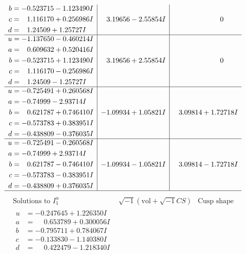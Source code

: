 \documentclass[1p]{elsarticle_modified}
\theoremstyle{definition}
\newcommand{\I}{\sqrt{-1}}
\begin{document}
$$\begin{array}{c|c|c}
\begin{aligned}
b &= -0.523715 - 1.123490 I \\
c &= \phantom{-}1.116170 + 0.256986 I \\
d &= \phantom{-}1.24509 + 1.25727 I\end{aligned}
 & \phantom{-}3.19656 - 2.55854 I & \phantom{-0.000000 } 0 \\ \hline\begin{aligned}
u &= -1.137650 - 0.460214 I \\
a &= \phantom{-}0.609632 + 0.520416 I \\
b &= -0.523715 + 1.123490 I \\
c &= \phantom{-}1.116170 - 0.256986 I \\
d &= \phantom{-}1.24509 - 1.25727 I\end{aligned}
 & \phantom{-}3.19656 + 2.55854 I & \phantom{-0.000000 } 0 \\ \hline\begin{aligned}
u &= -0.725491 + 0.260568 I \\
a &= -0.74999 - 2.93714 I \\
b &= \phantom{-}0.621787 + 0.746410 I \\
c &= -0.573783 + 0.383951 I \\
d &= -0.438809 - 0.376035 I\end{aligned}
 & -1.09934 + 1.05821 I & \phantom{-}3.09814 + 1.72718 I \\ \hline\begin{aligned}
u &= -0.725491 - 0.260568 I \\
a &= -0.74999 + 2.93714 I \\
b &= \phantom{-}0.621787 - 0.746410 I \\
c &= -0.573783 - 0.383951 I \\
d &= -0.438809 + 0.376035 I\end{aligned}
 & -1.09934 - 1.05821 I & \phantom{-}3.09814 - 1.72718 I\\
 \hline 
 \end{array}$$\newpage$$\begin{array}{c|c|c}  
\text{Solutions to }I^u_{1}& \I (\text{vol} + \sqrt{-1}CS) & \text{Cusp shape}\\
 \hline 
\begin{aligned}
u &= -0.247645 + 1.226350 I \\
a &= \phantom{-}0.653789 + 0.300056 I \\
b &= -0.795711 + 0.784067 I \\
c &= -0.133830 - 1.140380 I \\
d &= \phantom{-}0.422479 - 1.218340 I\end{aligned}

\end{array}$$
\end{document}
